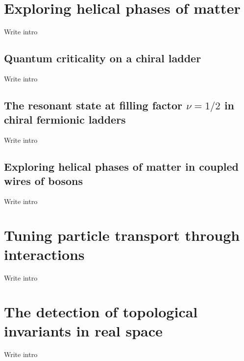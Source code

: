 
\chapter{Exploring helical phases of matter}
\label{ch:Exploring_helical_phases_of_matter}
Write intro
\section{Quantum criticality on a chiral ladder}
Write intro

\section{The resonant state at filling factor \texorpdfstring{$\nu=1/2$}{nu=1/2} in chiral fermionic ladders}
Write intro

\section{Exploring helical phases of matter in coupled wires of bosons}
Write intro


\chapter{Tuning particle transport through interactions}
\label{ch:Tuning_particle_transport_through_interactions}
Write intro



\chapter{The detection of topological invariants in real space}
\label{ch:The_detection_of_topological_invariants_in_real_space}
Write intro


